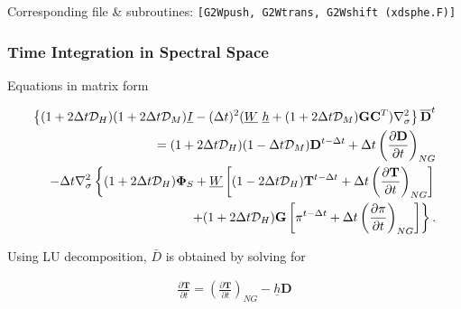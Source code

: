 Corresponding file \& subroutines: \texttt{{[}G2Wpush,\ G2Wtrans,\ G2Wshift\ (xdsphe.F){]}}

\hypertarget{time-integration-in-spectral-space}{%
\subsubsection{Time Integration in Spectral Space}\label{time-integration-in-spectral-space}}

Equations in matrix form

\begin{eqnarray}
      \left\{ ( 1+2\Delta t {\mathcal D}_H )( 1+2\Delta t {\mathcal D}_M )
           \underline{I}  
      - ( \Delta t )^{2}  ( \underline{W} \ \underline{h}
           + (1+2\Delta t {\mathcal D}_M)
             {\mathbf{G}} {\mathbf{C}}^{T} ) \nabla^{2}_{\sigma}
  \right\}
      \overline{ {\mathbf{D}} }^{t}
       \\
  = ( 1+2\Delta t {\mathcal D}_H )( 1-\Delta t {\mathcal D}_M )
       {\mathbf{D}}^{t-\Delta t}
  +\Delta t
         \left( \frac{\partial {\mathbf{D}}}{\partial t} \right)_{NG}  
  \\
  -\Delta t \nabla^{2}_{\sigma}     
                   \left\{  ( 1+2\Delta t {\mathcal D}_H ) {\mathbf{\Phi}}_{S}
                          + \underline{W}
                            \left[ ( 1-2\Delta t {\mathcal D}_H )
                                    {\mathbf{T}}^{t-\Delta t}
                                  + \Delta t
                                      \left( \frac{\partial {\mathbf{T}}}
                                                  {\partial t}     
                                      \right)_{NG} \right]
                   \right.
  \\
                 \left.  \hspace*{20mm}
                          + ( 1+2\Delta t {\mathcal D}_H ) {\mathbf{G}}
                            \left[ \pi^{t-\Delta t}
                                  + \Delta t
                                     \left( \frac{\partial \pi}
                                                 {\partial t}
                                     \right)_{NG}  \right]
                   \right\} .
\end{eqnarray}

Using LU decomposition, \(\bar{D}\) is obtained by solving for

\begin{eqnarray}
  \frac{\partial {\mathbf{T}}}{\partial t}
      =   \left( \frac{\partial {\mathbf{T}}}
                        {\partial t}       \right)_{NG}  
         - \underline{h} {\mathbf{D}}
\end{eqnarray}

